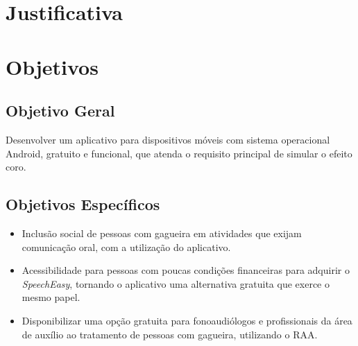 \section{Justificativa}

\section{Objetivos}

\subsection{Objetivo Geral}

Desenvolver um aplicativo para dispositivos m\'oveis com sistema operacional Android, gratuito e funcional, que atenda o requisito principal de simular o efeito coro. 

\subsection{Objetivos Espec\'ificos}

\begin{itemize}
	\item Inclus\~ao social de pessoas com gagueira em atividades que exijam comunica\c{c}\~ao oral, com a utiliza\c{c}\~ao do aplicativo.
	\item Acessibilidade para pessoas com poucas condi\c{c}\~oes financeiras para adquirir o \textit{SpeechEasy}, tornando o aplicativo uma alternativa gratuita que exerce o mesmo papel.
	\item Disponibilizar uma op\c{c}\~ao gratuita para fonoaudi\'ologos e profissionais da \'area de aux\'ilio ao tratamento de pessoas com gagueira, utilizando o RAA.
\end{itemize} 
